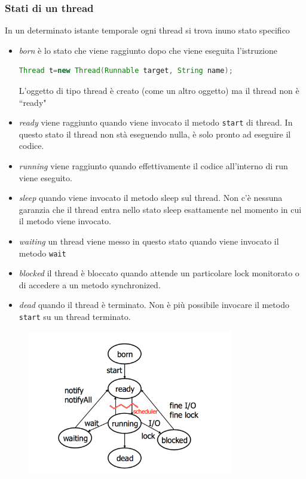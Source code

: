 \documentclass{article}
\begin{document}
\subsubsection{Stati di un thread}
In un determinato istante temporale ogni thread si trova inuno stato specifico
\begin{itemize}
\item \emph{born} \`e lo stato che viene raggiunto dopo che  viene eseguita l'istruzione 
\begin{lstlisting}[language=Java]
Thread t=new Thread(Runnable target, String name);
\end{lstlisting}
L'oggetto di tipo thread \`e creato (come un altro oggetto) ma il thread non \`e  ``ready"
\item \emph{ready} viene raggiunto quando viene invocato il metodo \texttt{start} di thread. In questo stato il thread non st\`a eseguendo nulla, \`e solo pronto ad eseguire il codice.
\item \emph{running} viene raggiunto quando effettivamente il codice all'interno di run viene eseguito. 
\item \emph{sleep} quando viene invocato il metodo sleep sul thread. Non c'\`e nessuna garanzia che il thread entra nello stato sleep esattamente nel momento in cui il metodo viene invocato. 
\item \emph{waiting} un thread viene messo in questo stato quando viene invocato il metodo \texttt{wait}
\item \emph{blocked} il thread \`e bloccato quando attende un particolare lock monitorato o di accedere a un metodo synchronized. 
\item \emph{dead} quando il thread \`e terminato. Non \`e pi\`u possibile invocare il metodo \texttt{start} su un thread terminato.
\end{itemize}

\begin{figure}[h!]
  \centering
    \includegraphics[width=0.8\textwidth]{stati.pdf}
\end{figure}
\end{document}

